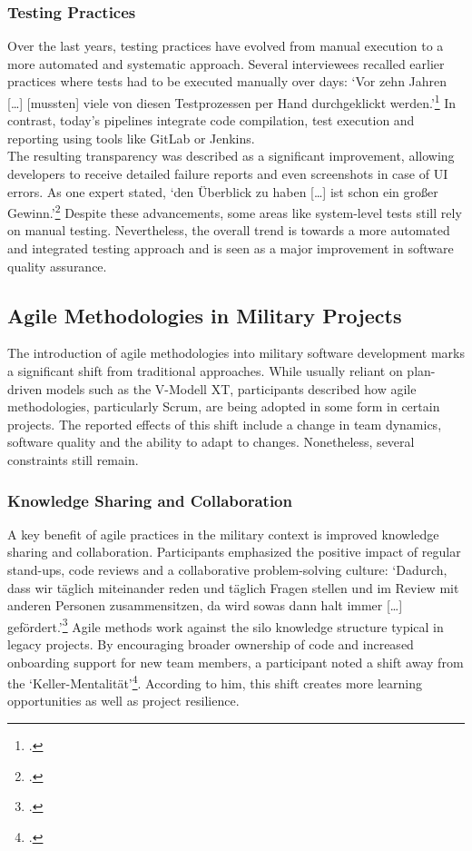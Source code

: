\subsubsection{Testing Practices}
Over the last years, testing practices have evolved from manual execution to a more automated and systematic approach. Several interviewees recalled earlier practices where tests had to be executed manually over days: `Vor zehn Jahren [\ldots] [mussten] viele von diesen Testprozessen per Hand durchgeklickt werden.'\footcite{interview2} In contrast, today's pipelines
integrate code compilation, test execution and reporting using tools like GitLab or Jenkins.\\
The resulting transparency was described as a significant improvement, allowing developers to receive detailed failure reports and even screenshots in case of \ac{UI} errors. As one expert stated, `den Überblick zu haben [\ldots] ist schon ein großer Gewinn.'\footcite{interview1}
Despite these advancements, some areas like system-level tests still rely on manual testing. Nevertheless, the overall trend is towards a more automated and integrated testing approach and is seen as a major improvement in software quality assurance.\\

\subsection{Agile Methodologies in Military Projects}
The introduction of agile methodologies into military software development marks a significant shift from traditional approaches. While usually reliant on plan-driven models such as the V-Modell XT, participants described how agile methodologies, particularly Scrum, are being adopted in some form in certain projects.
The reported effects of this shift include a change in team dynamics, software quality and the ability to adapt to changes. Nonetheless, several constraints still remain.

\subsubsection{Knowledge Sharing and Collaboration}
A key benefit of agile practices in the military context is improved knowledge sharing and collaboration. Participants emphasized the positive impact of regular stand-ups, code reviews and a collaborative problem-solving culture: `Dadurch, dass wir täglich miteinander reden und täglich Fragen stellen und im Review mit anderen 
Personen zusammensitzen, da wird sowas dann halt immer [\ldots] gefördert.'\footcite{interview3} Agile methods work against the silo knowledge structure typical in legacy projects. By encouraging broader ownership of code and increased onboarding support for new team members, a participant noted a shift away from the `Keller-Mentalität'\footcite{interview2}. According to him,
this shift creates more learning opportunities as well as project resilience.\\


